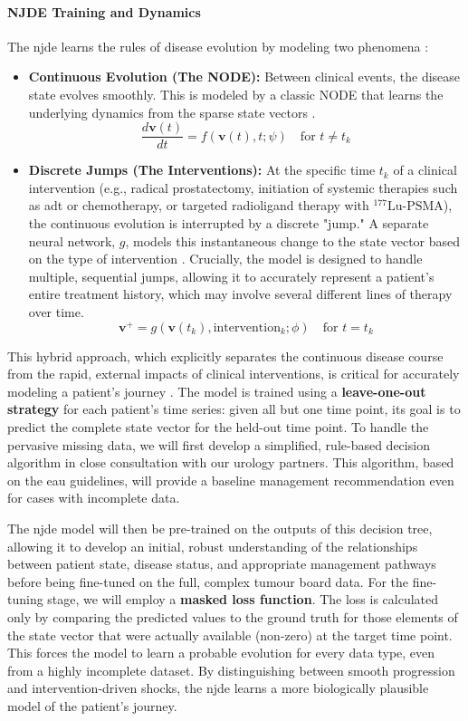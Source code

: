 \documentclass[11pt, a4paper]{article}
\begin{document}
\paragraph{NJDE Training and Dynamics}
The \gls{njde} learns the rules of disease evolution by modeling two phenomena \cite{GwakSim2020}:
\begin{itemize}
    \item \textbf{Continuous Evolution (The NODE):} Between clinical events, the disease state evolves smoothly. This is modeled by a classic NODE that learns the underlying dynamics from the sparse state vectors \cite{BergHasenclever2018}.
    $$ \frac{d\mathbf{v}(t)}{dt} = f(\mathbf{v}(t), t; \psi) \quad \text{for } t \neq t_k $$
    \item \textbf{Discrete Jumps (The Interventions):} At the specific time $t_k$ of a clinical intervention (e.g., radical prostatectomy, initiation of systemic therapies such as \gls{adt} or chemotherapy, or targeted radioligand therapy with $^{\text{177}}\text{Lu-PSMA}$), the continuous evolution is interrupted by a discrete "jump." A separate neural network, $g$, models this instantaneous change to the state vector based on the type of intervention \cite{CuchieroLarsson2019, AbushaqraXue2022}. Crucially, the model is designed to handle multiple, sequential jumps, allowing it to accurately represent a patient's entire treatment history, which may involve several different lines of therapy over time.
    $$ \mathbf{v}^+ = g(\mathbf{v}(t_k), \text{intervention}_k; \phi) \quad \text{for } t = t_k $$
\end{itemize}




This hybrid approach, which explicitly separates the continuous disease course from the rapid, external impacts of clinical interventions, is critical for accurately modeling a patient's journey \cite{GwakSim2020}. The model is trained using a \textbf{leave-one-out strategy} for each patient's time series: given all but one time point, its goal is to predict the complete state vector for the held-out time point. To handle the pervasive missing data, we will first develop a simplified, rule-based decision algorithm in close consultation with our urology partners. This algorithm, based on the \gls{eau} guidelines, will provide a baseline management recommendation even for cases with incomplete data.


The \gls{njde} model will then be pre-trained on the outputs of this decision tree, allowing it to develop an initial, robust understanding of the relationships between patient state, disease status, and appropriate management pathways before being fine-tuned on the full, complex tumour board data. For the fine-tuning stage, we will employ a \textbf{masked loss function}. The loss is calculated only by comparing the predicted values to the ground truth for those elements of the state vector that were actually available (non-zero) at the target time point. This forces the model to learn a probable evolution for every data type, even from a highly incomplete dataset. By distinguishing between smooth progression and intervention-driven shocks, the \gls{njde} learns a more biologically plausible model of the patient's journey.
\end{document}

